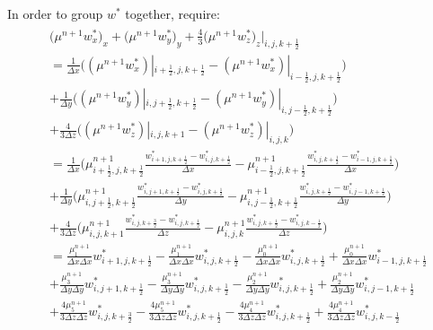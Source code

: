 \documentclass{article}
\numberwithin{equation}{subsection}
\begin{document}
In order to group $w^*$ together, require:
\begin{align}
\begin{split}
& \Big(\mu^{n+1} w^*_x\Big)_x + \Big(\mu^{n+1} w^*_y \Big)_y  + \frac{4}{3}\Big(\mu^{n+1} w^*_z\Big)_z |_{i,j,k+\frac{1}{2}} \\
& = \frac{1}{\Delta x}\Big((\mu^{n+1}w^*_x)|_{i+\frac{1}{2},j,k+\frac{1}{2}} - (\mu^{n+1}w^*_x)|_{i-\frac{1}{2},j,k+\frac{1}{2}}\Big) \\
& + \frac{1}{\Delta y}\Big((\mu^{n+1}w^*_y)|_{i,j+\frac{1}{2},k+\frac{1}{2}} - (\mu^{n+1}w^*_y)|_{i,j-\frac{1}{2},k+\frac{1}{2}}\Big) \\
& + \frac{4}{3\Delta z}\Big((\mu^{n+1}w^*_z)|_{i,j,k+1} - (\mu^{n+1}w^*_z)|_{i,j,k}\Big) \\
& = \frac{1}{\Delta x}\Big(\mu^{n+1}_{i+\frac{1}{2},j,k+\frac{1}{2}}\frac{w^*_{i+1,j,k+\frac{1}{2}}-w^*_{i,j,k+\frac{1}{2}}}{\Delta x} - \mu^{n+1}_{i-\frac{1}{2},j,k+\frac{1}{2}}\frac{w^*_{i,j,k+\frac{1}{2}}-w^*_{i-1,j,k+\frac{1}{2}}}{\Delta x} \Big) \\
& + \frac{1}{\Delta y}\Big(\mu^{n+1}_{i,j+\frac{1}{2},k+\frac{1}{2}}\frac{w^*_{i,j+1,k+\frac{1}{2}}-w^*_{i,j,k+\frac{1}{2}}}{\Delta y} - \mu^{n+1}_{i,j-\frac{1}{2},k+\frac{1}{2}}\frac{w^*_{i,j,k+\frac{1}{2}}-w^*_{i,j-1,k+\frac{1}{2}}}{\Delta y}\Big) \\
& + \frac{4}{3\Delta z}\Big(\mu^{n+1}_{i,j,k+1}\frac{w^*_{i,j,k+\frac{3}{2}}-w^*_{i,j,k+\frac{1}{2}}}{\Delta z} - \mu^{n+1}_{i,j,k}\frac{w^*_{i,j,k+\frac{1}{2}}-w^*_{i,j,k-\frac{1}{2}}}{\Delta z}\Big) \\
& = \frac{\mu^{n+1}_1}{\Delta x \Delta x}w^*_{i+1,j,k+\frac{1}{2}} - \frac{\mu^{n+1}_1}{\Delta x \Delta x}w^*_{i,j,k+\frac{1}{2}} -\frac{\mu^{n+1}_0}{\Delta x \Delta x}w^*_{i,j,k+\frac{1}{2}} + \frac{\mu^{n+1}_0}{\Delta x \Delta x}w^*_{i-1,j,k+\frac{1}{2}} \\
& + \frac{\mu^{n+1}_3}{\Delta y \Delta y}w^*_{i,j+1,k+\frac{1}{2}} -\frac{\mu^{n+1}_3}{\Delta y \Delta y}w^*_{i,j,k+\frac{1}{2}} - \frac{\mu^{n+1}_2}{\Delta y \Delta y}w^*_{i,j,k+\frac{1}{2}} + \frac{\mu^{n+1}_2}{\Delta y \Delta y}w^*_{i,j-1,k+\frac{1}{2}}\\
& + \frac{4\mu^{n+1}_5}{3\Delta z \Delta z}w^*_{i,j,k+\frac{3}{2}} - \frac{4\mu^{n+1}_5}{3\Delta z \Delta z}w^*_{i,j,k+\frac{1}{2}} - \frac{4\mu^{n+1}_4}{3\Delta z \Delta z}w^*_{i,j,k+\frac{1}{2}} + \frac{4\mu^{n+1}_4}{3\Delta z \Delta z}w^*_{i,j,k-\frac{1}{2}}
\end{split}
\end{align}
\end{document}
